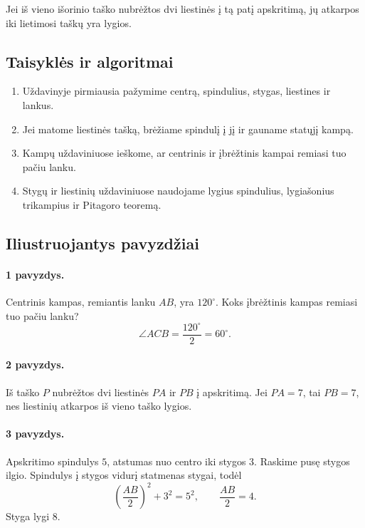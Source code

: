 \begin{savybe}
Jei iš vieno išorinio taško nubrėžtos dvi liestinės į tą patį apskritimą, jų atkarpos iki lietimosi taškų yra lygios.
\end{savybe}

\subsection{Taisyklės ir algoritmai}

\begin{enumerate}
\item Uždavinyje pirmiausia pažymime centrą, spindulius, stygas, liestines ir lankus.
\item Jei matome liestinės tašką, brėžiame spindulį į jį ir gauname statųjį kampą.
\item Kampų uždaviniuose ieškome, ar centrinis ir įbrėžtinis kampai remiasi tuo pačiu lanku.
\item Stygų ir liestinių uždaviniuose naudojame lygius spindulius, lygiašonius trikampius ir Pitagoro teoremą.
\end{enumerate}

\subsection{Iliustruojantys pavyzdžiai}

\paragraph{1 pavyzdys.}
Centrinis kampas, remiantis lanku $AB$, yra $120^\circ$. Koks įbrėžtinis kampas remiasi tuo pačiu lanku?
\[
\angle ACB=\frac{120^\circ}{2}=60^\circ.
\]

\paragraph{2 pavyzdys.}
Iš taško $P$ nubrėžtos dvi liestinės $PA$ ir $PB$ į apskritimą. Jei $PA=7$, tai $PB=7$, nes liestinių atkarpos iš vieno taško lygios.

\paragraph{3 pavyzdys.}
Apskritimo spindulys $5$, atstumas nuo centro iki stygos $3$. Raskime pusę stygos ilgio.
Spindulys į stygos vidurį statmenas stygai, todėl
\[
\left(\frac{AB}{2}\right)^2+3^2=5^2,\qquad \frac{AB}{2}=4.
\]
Styga lygi $8$.

